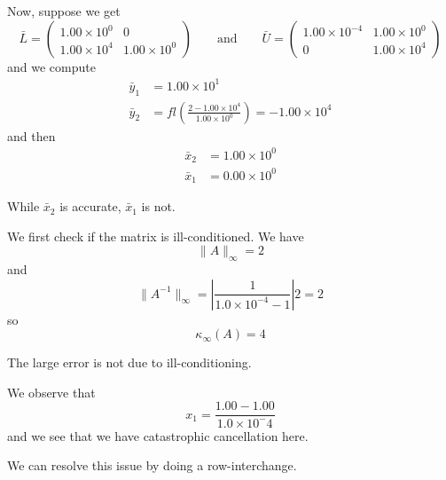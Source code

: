 \begin{example}
    Now, suppose we get \[
        \bar{L} = \begin{pmatrix}
            1.00 \times 10^0 & 0 \\ 1.00 \times 10^4 & 1.00 \times 10^0
        \end{pmatrix}
        \qquad \text{and} \qquad
        \bar{U} = \begin{pmatrix}
            1.00 \times 10^{-4} & 1.00 \times 10^0 \\ 0 & 1.00 \times 10^4
        \end{pmatrix}
    \]
    and we compute
    \begin{align*}
        \bar{y}_1
         & = 1.00 \times 10^1                                               \\
        \bar{y}_2
         & = fl\left( \frac{2 - 1.00 \times 10^4}{1.00 \times 10^0} \right)
        = -1.00 \times 10^4
    \end{align*} and then
    \begin{align*}
        \bar{x}_2 & = 1.00 \times 10^0 \\
        \bar{x}_1 & = 0.00 \times 10^0
    \end{align*}

    While \( \bar{x}_2 \) is accurate, \( \bar{x}_1 \) is not.

    We first check if the matrix is ill-conditioned. We have \[
        \| A \|_\infty = 2
    \] and \[
        \| A^{-1} \|_\infty = \left| \frac{1}{1.0 \times10^{-4} - 1} \right| 2 = 2
    \] so \[
        \kappa_\infty(A) = 4
    \]

    The large error is not due to ill-conditioning. 

    We observe that \[
        x_1 = \frac{1.00 - 1.00}{1.0 \times 10^-4}
    \] and we see that we have catastrophic cancellation here.

    We can resolve this issue by doing a row-interchange.
\end{example}